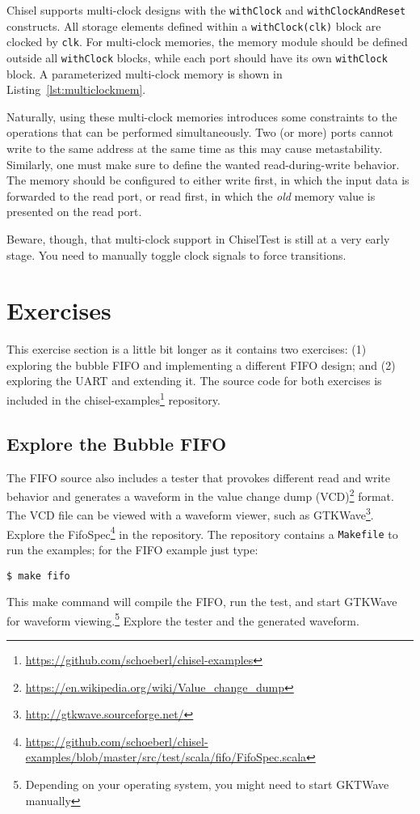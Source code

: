 \documentclass[%
    10pt,
    headinclude, footexclude,
    openright, %
    notitlepage,
    cleardoubleempty,
    headsepline,
    pointlessnumbers,
    bibtotoc, idxtotoc,
    ]{scrbook}
\newcommand{\code}[1]{{\lstinline[basicstyle=\small\ttfamily]{#1}}}
\newcommand{\myref}[2]{\href{#1}{#2}}
\renewcommand{\myref}[2]{{#2}{\footnote{\url{#1}}}}
\begin{document}
Chisel supports multi-clock designs with the \code{withClock} and
\code{withClockAndReset} constructs. All storage elements defined within a
\code{withClock(clk)} block are clocked by \code{clk}. For multi-clock memories,
the memory module should be defined outside all \code{withClock} blocks, while
each port should have its own \code{withClock} block. A parameterized
multi-clock memory is shown in Listing~\ref{lst:multiclockmem}.


Naturally, using these multi-clock memories introduces some constraints to the
operations that can be performed simultaneously. Two (or more) ports cannot
write to the same address at the same time as this may cause metastability.
Similarly, one must make sure to define the wanted read-during-write behavior.
The memory should be configured to either write first, in which the input data is
forwarded to the read port, or read first, in which the \emph{old} memory value
is presented on the read port.

Beware, though, that multi-clock support in ChiselTest is still at a very early
stage. You need to manually toggle clock signals to force transitions.


\section{Exercises}

This exercise section is a little bit longer as it contains two exercises:
(1) exploring the bubble FIFO and implementing a different FIFO design;
and (2) exploring the UART and extending it.
The source code for both exercises is included in the
\myref{https://github.com/schoeberl/chisel-examples}{chisel-examples} repository.

\subsection{Explore the Bubble FIFO}

The FIFO source also includes a tester that provokes different read and write behavior and generates a waveform in the
\myref{https://en.wikipedia.org/wiki/Value_change_dump}{value change dump (VCD)} format.
The VCD file can be viewed with a waveform viewer, such as
\myref{http://gtkwave.sourceforge.net/}{GTKWave}.
Explore the
\myref{https://github.com/schoeberl/chisel-examples/blob/master/src/test/scala/fifo/FifoSpec.scala}{FifoSpec} in the repository.
The repository contains a \code{Makefile} to run the examples; for the FIFO example
just type:
\begin{verbatim}
$ make fifo
\end{verbatim}
This make command will compile the FIFO, run the test, and start GTKWave for waveform
viewing.\footnote{Depending on your operating system, you might need to start GKTWave
manually} Explore the tester and the generated waveform.
\end{document}
